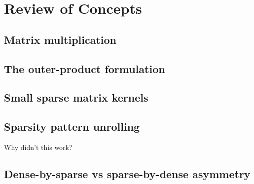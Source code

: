 \chapter{Review of Concepts}
\label{chapter:review}

\section{Matrix multiplication}

\section{The outer-product formulation}

\section{Small sparse matrix kernels}

\section{Sparsity pattern unrolling}
Why didn't this work?

\section{Dense-by-sparse vs sparse-by-dense asymmetry}

